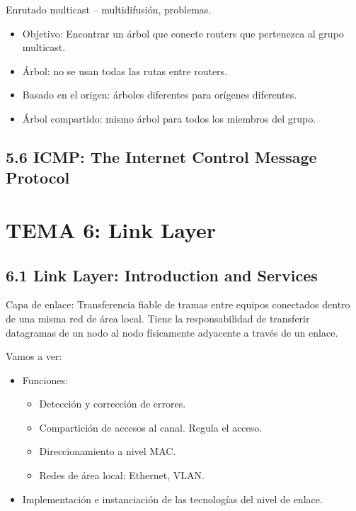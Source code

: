 \documentclass[12pt, twoside, openright]{report} %
\begin{document}
Enrutado multicast -- multidifusión, problemas.

\begin{itemize}
	\item Objetivo: Encontrar un árbol que conecte routers que pertenezca al
	      grupo multicast.
	\item Árbol: no se usan todas las rutas entre routers.
	\item Basado en el origen: árboles diferentes para orígenes diferentes.
	\item Árbol compartido: mismo árbol para todos los miembros del grupo.
\end{itemize}

\section{5.6 ICMP: The Internet Control Message Protocol}


\chapter{TEMA 6: Link Layer}

\section{6.1 Link Layer: Introduction and Services}

Capa de enlace: Transferencia fiable de tramas entre equipos
conectados dentro de una misma red de área local. Tiene la
responsabilidad de transferir datagramas de un nodo al nodo
físicamente adyacente a través de un enlace.

Vamos a ver:

\begin{itemize}
	\item Funciones:

	      \begin{itemize}
		      \item Detección y corrección de errores.
		      \item Compartición de accesos al canal. Regula el acceso.
		      \item Direccionamiento a nivel MAC.
		      \item Redes de área local: Ethernet, VLAN.
	      \end{itemize}
	\item Implementación e instanciación de las tecnologías del nivel de
	      enlace.
\end{itemize}
\end{document}
